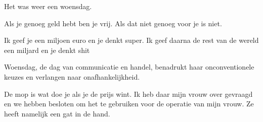 Het was weer een woensdag.

Als je genoeg geld hebt ben je vrij. Als dat niet genoeg voor je is niet.

Ik geef je een miljoen euro en je denkt super. Ik geef daarna de rest van de wereld een miljard en je denkt shit

Woensdag, de dag van communicatie en handel, benadrukt haar onconventionele keuzes en verlangen naar onafhankelijkheid.

De mop is wat doe je als je de prijs wint. Ik heb daar mijn vrouw over gevraagd en we hebben besloten om het te gebruiken voor de operatie van mijn vrouw. Ze heeft namelijk een gat in de hand.
